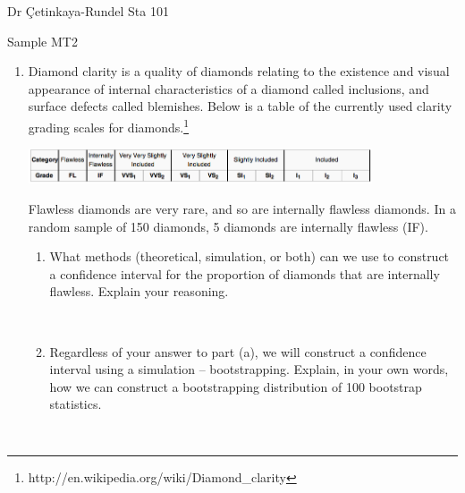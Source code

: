 \documentclass[11pt]{article}
\newcommand{\soln}[2]{$\:$\\ \vspace{#1}}{}
\begin{document}
%

Dr \c{C}etinkaya-Rundel \hfill Sta 101 \\

\begin{center}
{\LARGE Sample MT2}
\end{center}

\begin{enumerate}

\item Diamond clarity is a quality of diamonds relating to the existence and visual appearance of internal characteristics 
of a diamond called inclusions, and surface defects called blemishes. Below is a table of the currently used clarity grading 
scales for diamonds.\footnote{http://en.wikipedia.org/wiki/Diamond\_clarity} 
\begin{center}
\includegraphics[width=0.8\textwidth]{figures/diamond/diamond_clarity.png} 
\end{center}
Flawless diamonds are very rare, and so are internally flawless diamonds. In a random sample of 150 diamonds, 5 
diamonds are internally flawless (IF).

\begin{enumerate}

\item What methods (theoretical, simulation, or both) can we use to construct a confidence interval for the proportion 
of diamonds that are internally flawless. Explain your reasoning.

\soln{3cm}{
We know that the sample is random and can safely assume 150 $<$ 10\% of all diamonds, so we can assume that one 
diamond in the sample is independent of another. In this sample there are 5 internally flawless diamonds (successes) 
and this is less than 10, we couldn't use theoretical methods, and must use simulation methods to construct this 
confidence interval.
}

\item Regardless of your answer to part (a), we will construct a confidence interval using a simulation -- bootstrapping. 
Explain, in your own words, how we can construct a bootstrapping distribution of 100 bootstrap statistics.

\soln{3cm}{
Sample, with replacement, 150 diamonds from the original sample and record the proportion internally flawless diamonds 
in this bootstrap sample. Repeat this 100 times and plot the distribution of the bootstrap proportions. 
}


\end{enumerate}
\end{enumerate}
\end{document}
